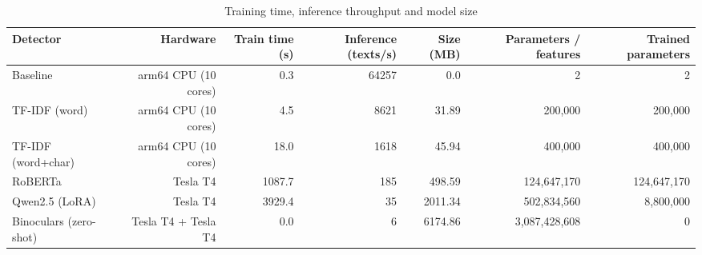 \begin{table}[!t]
\centering
\caption{Training time, inference throughput and model size}
\label{tab:efficiency}
\footnotesize
\begin{tabular}{lrrrrrr}
\toprule
\textbf{Detector} & \textbf{Hardware} & \textbf{Train time (s)} & \textbf{Inference (texts/s)} & \textbf{Size (MB)} & \textbf{Parameters / features} & \textbf{Trained parameters} \\
\midrule
Baseline & arm64 CPU (10 cores) & 0.3 & 64257 & 0.0 & 2 & 2 \\
TF-IDF (word) & arm64 CPU (10 cores) & 4.5 & 8621 & 31.89 & 200,000 & 200,000 \\
TF-IDF (word+char) & arm64 CPU (10 cores) & 18.0 & 1618 & 45.94 & 400,000 & 400,000 \\
RoBERTa & Tesla T4 & 1087.7 & 185 & 498.59 & 124,647,170 & 124,647,170 \\
Qwen2.5 (LoRA) & Tesla T4 & 3929.4 & 35 & 2011.34 & 502,834,560 & 8,800,000 \\
Binoculars (zero-shot) & Tesla T4 + Tesla T4 & 0.0 & 6 & 6174.86 & 3,087,428,608 & 0 \\
\bottomrule
\end{tabular}
\end{table}
